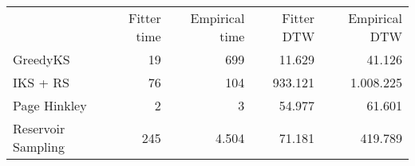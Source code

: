 \begin{tabular}{lrrrr}
 & Fitter time & Empirical time & Fitter DTW & Empirical DTW \\
GreedyKS & 19 & 699 & 11.629 & 41.126 \\
IKS + RS & 76 & 104 & 933.121 & 1.008.225 \\
Page Hinkley & 2 & 3 & 54.977 & 61.601 \\
Reservoir Sampling & 245 & 4.504 & 71.181 & 419.789 \\
\end{tabular}
